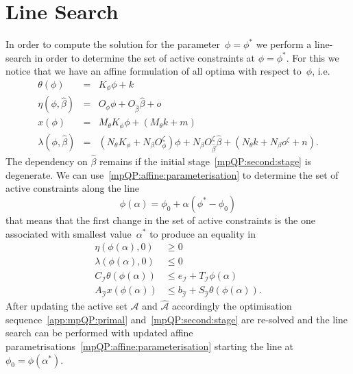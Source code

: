 \section{Line Search}
%
In order to compute the solution for the parameter~$\phi = \phi^\ast$ we perform a line-search in order
to determine the set of active constraints at $\phi = \phi^\ast$.
%
For this we notice that we have an affine formulation of all optima with respect to~$\phi$, i.e.
%
\begin{equation}\label{mpQP:affine:parameterisation}
	\begin{array}{rcl} 
	\theta(\phi) &=&K_\phi \phi + k\\
	\eta(\phi,\hat \beta) &=& O_\phi \phi + O_{\hat\beta}\hat\beta + o\\
	x(\phi) &=& M_\theta K_\phi \phi + (M_\theta k+ m)\\
	\lambda(\phi, \hat\beta) &=& (N_\theta K_\phi + N_\beta O^\zeta_\phi)\phi + 
	N_\beta O^\zeta_{\hat\beta}\hat\beta + (N_\theta k + N_\beta o^\zeta + n) .
	\end{array}
\end{equation}
%
The dependency on $\hat\beta$ remains if the initial stage~\eqref{mpQP:second:stage} is degenerate.
%
We can use~\eqref{mpQP:affine:parameterisation} to determine the set of active constraints along the line
%
\begin{equation}
	\phi(\alpha) = \phi_0 + \alpha(\phi^\ast-\phi_0)
\end{equation}
%
that means that the first change in the set of active constraints is the one associated with smallest
value~$\alpha^\ast$ to produce an equality in
%
\begin{equation}\label{mpQP:conditions:for:the:line:search}
	\begin{split}
	\eta(\phi(\alpha),0)&\geq0\\
	\lambda(\phi(\alpha),0)&\leq0\\
	C_{\mathcal I}\theta(\phi(\alpha))&\leq e_{\mathcal I} + T_{\mathcal I}\phi(\alpha)\\
	A_{\hat{\mathcal I}}x(\phi(\alpha))&\leq b_{\hat{\mathcal I}}+S_{\hat{\mathcal I}}\theta(\phi(\alpha)).
	\end{split}
\end{equation}
%
After updating the active set $\mathcal A$ and $\hat{\mathcal A}$ accordingly the optimisation sequence~\eqref{app:mpQP:primal}
and~\eqref{mpQP:second:stage} are re-solved and the line search can be performed with updated affine 
parametrisations~\eqref{mpQP:affine:parameterisation} starting the line at~$\phi_0=\phi(\alpha^\ast)$.


